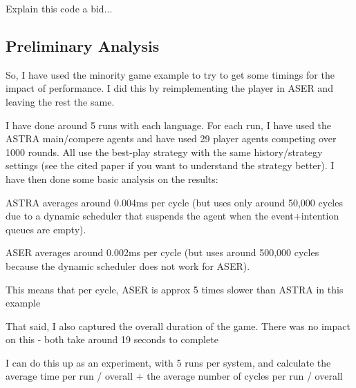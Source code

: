 Explain this code a bid...

\subsection{Preliminary Analysis}
\label{performance}


So, I have used the minority game example to try to get some timings for the impact of performance. I did this by reimplementing the player in ASER and leaving the rest the same.

I have done around 5 runs with each language. For each run, I have used the ASTRA main/compere agents and have used 29 player agents competing over 1000 rounds. All use the best-play strategy with the same history/strategy settings (see the cited paper if you want to understand the strategy better). I have then done some basic analysis on the results:

ASTRA averages around 0.004ms per cycle (but uses only around 50,000 cycles due to a dynamic scheduler that suspends the agent when the event+intention queues are empty).

ASER averages around 0.002ms per cycle (but uses around 500,000 cycles because the dynamic scheduler does not work for ASER).

This means that per cycle, ASER is approx 5 times slower than ASTRA in this example

That said, I also captured the overall duration of the game. There was no impact on this - both take around 19 seconds to complete

I can do this up as an experiment, with 5 runs per system, and calculate the average time per run / overall + the average number of cycles per run / overall